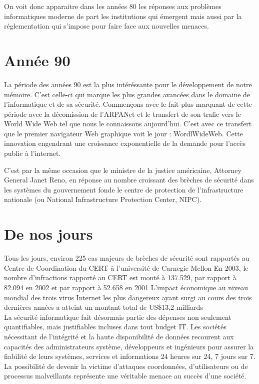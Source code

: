 \documentclass[a4paper]{memoir}
\begin{document}
On voit donc apparaitre dans les années 80 les réponses aux problèmes informatiques moderne de part les institutions qui émergent mais aussi par la réglementation qui s'impose pour faire face aux nouvelles menaces.

\section{Année 90}

La période des années 90 est la plus intéréssante pour le développement de notre mémoire. C'est celle-ci qui marque les plus grandes avancées dans le domaine de l'informatique et de sa sécurité.
Commençons avec le fait plus marquant de cette période avec la décomission de l'ARPANet et le transfert de son trafic vers le World Wide Web tel que nous le connaissons aujourd'hui. C'est avec ce transfert que le premier navigateur Web graphique voit le jour : WordlWideWeb. Cette innovation engendrant une croissance exponentielle de la demande pour l'accès public à l'internet.


C'est par la même occasion que le ministre de la justice américaine, Attorney General Janet Reno, en réponse au nombre croissant des brèches de sécurité dans les systèmes du gouvernement fonde le centre de protection de l'infrastructure nationale (ou National Infrastructure Protection Center, NIPC).


\section{De nos jours}

Tous les jours, environ 225 cas majeurs de brèches de sécurité sont rapportés au Centre de Coordination du CERT à l'université de Carnegie Mellon
En 2003, le nombre d'infractions rapporté au CERT est monté à 137.529, par rapport à 82.094 en 2002 et par rapport à 52.658 en 2001
L'impact économique au niveau mondial des trois virus Internet les plus dangereux ayant surgi au cours des trois dernières années a atteint un montant total de US\$13,2 milliards\\

La sécurité informatique fait désormais partie des dépenses non seulement quantifiables, mais justifiables incluses dans tout budget IT. Les sociétés nécessitant de l'intégrité et la haute disponibilité de données recourent aux capacités des administrateurs système, développeurs et ingénieurs pour assurer la fiabilité de leurs systèmes, services et informations 24 heures sur 24, 7 jours sur 7. La possibilité de devenir la victime d'attaques coordonnées, d'utilisateurs ou de processus malveillants représente une véritable menace au succès d'une société. 
\end{document}
